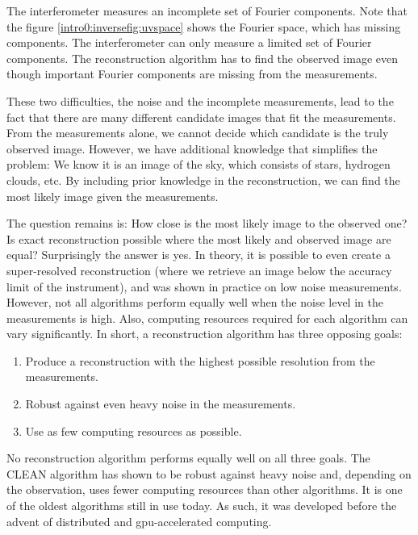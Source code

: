 The interferometer measures an incomplete set of Fourier components. Note that the figure \ref{intro0:inversefig:uvspace} shows the Fourier space, which has missing components. The interferometer can only measure a limited set of Fourier components. The reconstruction algorithm has to find the observed image even though important Fourier components are missing from the measurements.

These two difficulties, the noise and the incomplete measurements, lead to the fact that there are many different candidate images that fit the measurements. From the measurements alone, we cannot decide which candidate is the truly observed image. However, we have additional knowledge that simplifies the problem: We know it is an image of the sky, which consists of stars, hydrogen clouds, etc. By including prior knowledge in the reconstruction, we can find the most likely image given the measurements. 

The question remains is: How close is the most likely image to the observed one? Is exact reconstruction possible where the most likely and observed image are equal? Surprisingly the answer is yes. In theory, it is possible to even create a super-resolved reconstruction (where we retrieve an image below the accuracy limit of the instrument)\cite{candes2006robust,donoho2006compressed}, and was shown in practice on low noise measurements\cite{dabbech2018cygnus, dabbech2015moresane}. However, not all algorithms perform equally well when the noise level in the measurements is high. Also, computing resources required for each algorithm can vary significantly. In short, a reconstruction algorithm has three opposing goals:
\begin{enumerate}
	\item Produce a reconstruction with the highest possible resolution from the measurements.
	\item Robust against even heavy noise in the measurements.
	\item Use as few computing resources as possible.
\end{enumerate}

No reconstruction algorithm performs equally well on all three goals. The CLEAN algorithm\cite{hogbom1974aperture, rau2011multi} has shown to be robust against heavy noise and, depending on the observation, uses fewer computing resources than other algorithms\cite{offringa2017optimized}. It is one of the oldest algorithms still in use today. As such, it was developed before the advent of distributed and gpu-accelerated computing. 



